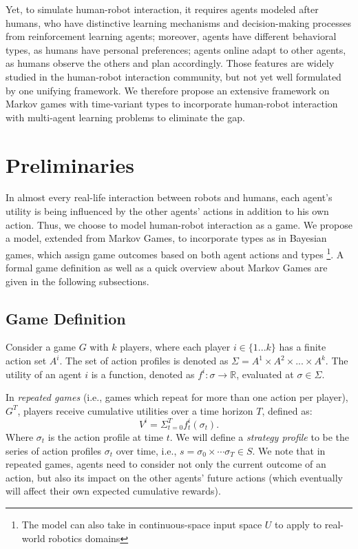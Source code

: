 \documentclass[letterpaper, 10 pt, conference]{ieeeconf}  %
\begin{document}
Yet, to simulate human-robot interaction, it requires agents modeled after 
humans, who have distinctive learning mechanisms and decision-making processes 
from reinforcement learning agents; moreover, agents have different behavioral 
types, as humans have personal preferences; agents online adapt to other 
agents, as humans observe the others and plan accordingly. Those features are 
widely studied in the human-robot interaction community, but not yet well 
formulated by one unifying framework. We therefore propose 
an extensive framework on Markov games with time-variant types to incorporate 
human-robot interaction with multi-agent learning problems to eliminate the gap. 



\section{Preliminaries}
In almost every real-life interaction between robots and humans, each agent's utility is being influenced by the other agents' actions in addition to his own action. Thus, we choose to model human-robot interaction as a game. We propose a model, extended from Markov Games, to incorporate types as in Bayesian games, which assign game outcomes based on both agent actions and types \footnote{The model can also take in continuous-space input space $U$ to apply to real-world robotics domains}. A formal game definition as well as a quick overview about Markov Games are given in the following subsections.  
\subsection{Game Definition}
Consider a game $G$ with $k$ players, where each player $i \in \{1...k\}$ has 
a finite action set $A^i$. The set of action profiles is denoted as 
$\Sigma = A^1 \times A^2 \times ... \times A^k$. The utility of an 
agent $i$ is a function, denoted as $f^i: \sigma \rightarrow \mathbb{R} $, 
evaluated at $\sigma \in \Sigma$. 

In \textit{repeated games} (i.e., games which repeat for more than one action per player), $G^T$, players receive cumulative utilities over a 
time horizon $T$, defined as:
\begin{equation}
	V^i=\Sigma_{t=0}^{T} f^i_t(\sigma_t).
\end{equation}
Where $\sigma_t$ is the action profile at time $t$.
We will define a \textit{strategy profile} to be the series of action profiles $\sigma_t$ over time, i.e., $s = \sigma_0 \times \cdots \sigma_T \in S$. We note that in repeated games, agents need to consider not only the current outcome of an action, but also its impact on the other agents' future actions (which eventually will affect their own expected cumulative rewards).
\end{document}
